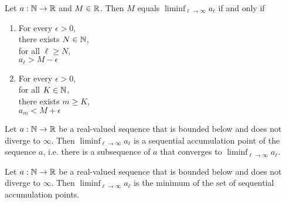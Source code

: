 \begin{proposition}
    Let $a: \mathbb{N} \to \mathbb{R}$ and $M \in \mathbb{R}$. Then $M$ equals $\liminf_{\ell\to\infty}a_\ell$ if and only if
    \begin{enumerate}
        \item 
            \begin{center}
                \parbox{\linewidth}{
                    \linewidth
                    For every $\epsilon > 0$, \\
                    \hspace*{1em} there exists $N \in \mathbb{N}$, \\
                    \hspace*{2em} for all $\ell \ge N$, \\
                    \hspace*{3em} $a_\ell > M - \epsilon$
                }
            \end{center}
        \item 
            \begin{center}
                \parbox{\linewidth}{
                    \linewidth
                    For every $\epsilon > 0$, \\
                    \hspace*{1em} for all $K \in \mathbb{N}$, \\
                    \hspace*{2em} there exists $m \ge K$, \\
                    \hspace*{3em} $a_m < M + \epsilon$ \\
                }
            \end{center}
    \end{enumerate}
\end{proposition}

\begin{theorem}
    Let $a: \mathbb{N} \to \mathbb{R}$ be a real-valued sequence that is bounded below and does not diverge to $\infty$. Then
    $\liminf_{\ell\to\infty}a_\ell$ is a sequential accumulation point of the sequence $a$, i.e. there is a
    subsequence of $a$ that converges to $\liminf_{\ell\to\infty}a_\ell$.
\end{theorem}

\begin{theorem}
    Let $a: \mathbb{N} \to \mathbb{R}$ be a real-valued sequence that is bounded below and does not diverge to $\infty$. Then
    $\liminf_{\ell\to\infty}a_\ell$ is the minimum of the set of sequential accumulation points.
\end{theorem}

